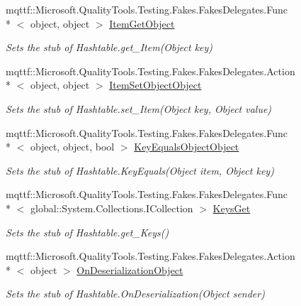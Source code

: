 \begin{DoxyCompactItemize}
mqttf\-::\-Microsoft.\-Quality\-Tools.\-Testing.\-Fakes.\-Fakes\-Delegates.\-Func\\*
$<$ object, object $>$ \hyperlink{class_system_1_1_collections_1_1_fakes_1_1_stub_hashtable_a96e973a21822ad1a15a2953a0a6ae70c}{Item\-Get\-Object}
\begin{DoxyCompactList}\small\item\em Sets the stub of Hashtable.\-get\-\_\-\-Item(\-Object key)\end{DoxyCompactList}\item 
mqttf\-::\-Microsoft.\-Quality\-Tools.\-Testing.\-Fakes.\-Fakes\-Delegates.\-Action\\*
$<$ object, object $>$ \hyperlink{class_system_1_1_collections_1_1_fakes_1_1_stub_hashtable_a237d4dbe947eff9deb15eaeca2fd14fa}{Item\-Set\-Object\-Object}
\begin{DoxyCompactList}\small\item\em Sets the stub of Hashtable.\-set\-\_\-\-Item(\-Object key, Object value)\end{DoxyCompactList}\item 
mqttf\-::\-Microsoft.\-Quality\-Tools.\-Testing.\-Fakes.\-Fakes\-Delegates.\-Func\\*
$<$ object, object, bool $>$ \hyperlink{class_system_1_1_collections_1_1_fakes_1_1_stub_hashtable_ac44829c2c1319a0193bb3b1ee9af7999}{Key\-Equals\-Object\-Object}
\begin{DoxyCompactList}\small\item\em Sets the stub of Hashtable.\-Key\-Equals(\-Object item, Object key)\end{DoxyCompactList}\item 
mqttf\-::\-Microsoft.\-Quality\-Tools.\-Testing.\-Fakes.\-Fakes\-Delegates.\-Func\\*
$<$ global\-::\-System.\-Collections.\-I\-Collection $>$ \hyperlink{class_system_1_1_collections_1_1_fakes_1_1_stub_hashtable_a17a8f0b017f99165713d0ce1dfb44385}{Keys\-Get}
\begin{DoxyCompactList}\small\item\em Sets the stub of Hashtable.\-get\-\_\-\-Keys()\end{DoxyCompactList}\item 
mqttf\-::\-Microsoft.\-Quality\-Tools.\-Testing.\-Fakes.\-Fakes\-Delegates.\-Action\\*
$<$ object $>$ \hyperlink{class_system_1_1_collections_1_1_fakes_1_1_stub_hashtable_a953339d5018b13d8464e038c3a67fb52}{On\-Deserialization\-Object}
\begin{DoxyCompactList}\small\item\em Sets the stub of Hashtable.\-On\-Deserialization(\-Object sender)\end{DoxyCompactList}\item 

\end{DoxyCompactItemize}
